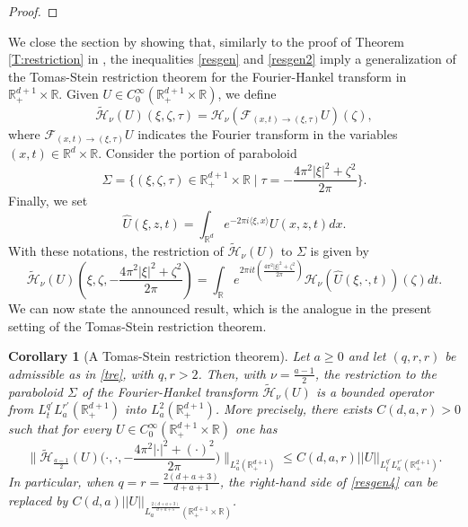 \documentclass[11pt,letter]{amsart}
\def \RN {\mathbb{R}_+^{d+1}}
\def \R {\mathbb{R}}
\newcommand{\Rd}{\mathbb R^d}
\numberwithin{equation}{section}
\newcommand{\sa}{\langle}
\newcommand{\da}{\rangle}
\newtheorem{corollary}[theorem]{Corollary}
\numberwithin{equation}{section}
\begin{document}
\begin{proof}
\end{proof}

We close the section by showing that, similarly to the proof of Theorem \ref{T:restriction} in \cite{GS}, the inequalities \eqref{resgen} and \eqref{resgen2} imply a generalization of the Tomas-Stein restriction theorem for the Fourier-Hankel transform in $\RN\times \R$. Given $U\in C^\infty_0(\RN\times \R)$, we define
\[
\tilde{\mathcal H}_\nu(U)(\xi,\zeta,\tau) = \mathcal H_{\nu}(\mathscr F_{(x,t)\to(\xi,\tau)} U)(\zeta),
\]
where $\mathscr F_{(x,t)\to(\xi,\tau)} U$ indicates the Fourier transform in the variables $(x,t)\in\Rd\times \R$. 
Consider the portion of paraboloid 
\[
\Sigma = \{(\xi,\zeta,\tau)\in \RN\times \R\mid \tau = - \frac{4\pi^2 |\xi|^2 +\zeta^2}{2\pi}\}.
\]
Finally, we set
\[
\hat U(\xi,z,t) = \int_{\Rd} e^{-2\pi i\sa\xi,x\da} U(x,z,t) dx.
\]
With these notations, the restriction of $\tilde{\mathcal H}_\nu(U)$ to $\Sigma$ is given by
\begin{equation}\label{restrSigma}
\tilde{\mathcal H}_\nu(U)(\xi,\zeta,- \frac{4\pi^2 |\xi|^2 +\zeta^2}{2\pi}) = \int_{\R} e^{2\pi i t (\frac{4\pi^2 |\xi|^2 +\zeta^2}{2\pi})}  \mathcal H_{\nu}(\hat U(\xi,\cdot,t))(\zeta) dt.
\end{equation}
We can now state the announced result, which is the analogue in the present setting of the Tomas-Stein restriction theorem.

\begin{corollary}[A Tomas-Stein restriction theorem]\label{C:TS}
Let $a\ge 0$ and let $(q,r,r)$ be admissible as in \eqref{tre}, with $q,r>2$. Then, with $\nu = \frac{a-1}2$, the restriction to the paraboloid $\Sigma$ of the Fourier-Hankel transform $\tilde{\mathcal H}_{\nu}(U)$ is a bounded operator from $L^{q'}_t L^{r'}_a(\RN)$ into $L^2_a(\RN)$. More precisely, there exists $C(d,a,r)>0$ such that for every $U\in C^\infty_0(\RN\times \R)$ one has
\begin{equation}\label{resgen4}
\Big\|\tilde{\mathcal H}_{\frac{a-1}2}(U)\Big(\cdot,\cdot,- \frac{4\pi^2 |\cdot|^2 +(\cdot)^2}{2\pi}\Big)\Big\|_{L^2_a(\RN)}\le C(d,a,r) ||U||_{L^{q'}_t L^{r'}_a(\RN)}.
\end{equation}
In particular, when $q = r = \frac{2(d+a+3)}{d+a+1}$, the right-hand side of \eqref{resgen4} can be replaced by $C(d,a) ||U||_{L^{\frac{2(d+a+3)}{d+a+5}}_a(\RN\times \R)}$.
\end{corollary}
\end{document}
